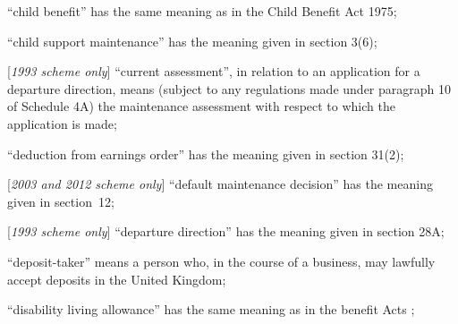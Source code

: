 \documentclass[12pt,a4paper]{article}
\begin{document}
\begin{enumerate}


    “child benefit” has the same meaning as in the Child Benefit Act 1975;


    “child support maintenance” has the meaning given in section 3(6);



[\emph{1993 scheme only}]     “current assessment”, in relation to an application for a departure direction, means (subject to any regulations made under paragraph 10 of Schedule 4A) the maintenance assessment with respect to which the application is made;

    “deduction from earnings order” has the meaning given in section 31(2);

[\emph{2003 and 2012 scheme only}] “default maintenance decision” has the meaning given in section~12;

[\emph{1993 scheme only}]     “departure direction” has the meaning given in section 28A;

“deposit-taker” means a person who, in the course of a business, may lawfully accept deposits in the United Kingdom;

    “disability living allowance” has the same meaning as in the 
benefit Acts%
;


\end{enumerate}
\end{document}
